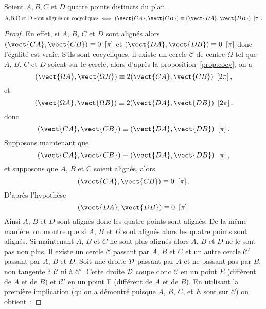 \begin{theo}
  Soient $A,B,C$ et $D$ quatre points distincts du plan.
  \begin{equation}
    \text{A,B,C et D sont alignés ou cocycliques} \iff \congru{(\vect{CA}, \vect{CB})}{(\vect{DA}, \vect{DB})}{\pi}.
  \end{equation}
\end{theo}
\begin{proof}
  En effet, si $A$, $B$, $C$ et $D$ sont alignés alors $\congru{(\vect{CA},\vect{CB})}{0}{\pi}$ et $\congru{(\vect{DA},\vect{DB})}{0}{\pi}$ donc l'égalité est vraie. S'ils sont cocycliques, il existe un cercle $\mathcal{C}$ de centre $\Omega$ tel que $A$, $B$, $C$ et $D$ soient sur le cercle, alors d'après la proposition~\ref{prop:cocy}, on a
  \begin{equation}
    \congru{(\vect{\Omega A}, \vect{\Omega B})}{2(\vect{CA},\vect{CB})}{2\pi},
  \end{equation}
  et 
  \begin{equation}
    \congru{(\vect{\Omega A}, \vect{\Omega B})}{2(\vect{DA},\vect{DB})}{2\pi},
  \end{equation}
  donc 
  \begin{equation}
    \congru{(\vect{CA},\vect{CB})}{(\vect{DA},\vect{DB})}{\pi}.
  \end{equation}
  Supposons maintenant que 
  \begin{equation}
    \congru{(\vect{CA},\vect{CB})}{(\vect{DA},\vect{DB})}{\pi},
  \end{equation}
  et supposons que $A$, $B$ et C soient alignés, alors 
  \begin{equation}
    \congru{(\vect{CA},\vect{CB})}{0}{\pi}.
  \end{equation}
  D'après l'hypothèse
  \begin{equation}
    \congru{(\vect{DA},\vect{DB})}{0}{\pi}.
  \end{equation}
  Ainsi $A$, $B$ et $D$ sont alignés donc les quatre points sont alignés. De la même manière, on montre que si $A$, $B$ et $D$ sont alignés alors les quatre points sont alignés. Si maintenant $A$, $B$ et $C$ ne sont plus alignés alors $A$, $B$ et $D$ ne le sont pas non plus. Il existe un cercle $\mathcal{C}$ passant par $A$, $B$ et $C$ et un autre cercle $\mathcal{C}'$ passant par $A$, $B$ et $D$. Soit une droite $\mathcal{D}$ passant par $A$ et ne passant pas par $B$, non tangente à $\mathcal{C}$ ni à $\mathcal{C}'$. Cette droite $\mathcal{D}$ coupe donc $\mathcal{C}$ en un point $E$ (différent de $A$ et de $B$) et $\mathcal{C}'$ en un point F (différent de $A$ et de $B$). En utilisant la première implication (qu'on a démontré puisque $A$, $B$, $C$, et $E$ sont sur $\mathcal{C}$) on obtient~:

\end{proof}
